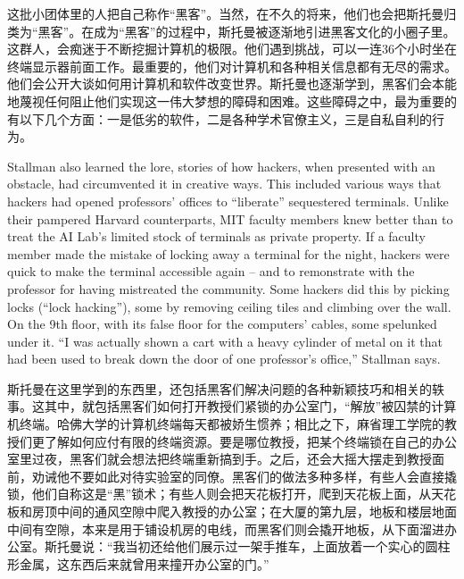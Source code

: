 \ifdefined\chs
这批小团体里的人把自己称作``黑客''。当然，在不久的将来，他们也会把斯托曼归类为``黑客''。在成为``黑客''的过程中，斯托曼被逐渐地引进黑客文化的小圈子里。这群人，会痴迷于不断挖掘计算机的极限。他们遇到挑战，可以一连36个小时坐在终端显示器前面工作。最重要的，他们对计算机和各种相关信息都有无尽的需求。他们会公开大谈如何用计算机和软件改变世界。斯托曼也逐渐学到，黑客们会本能地蔑视任何阻止他们实现这一伟大梦想的障碍和困难。这些障碍之中，最为重要的有以下几个方面：一是低劣的软件，二是各种学术官僚主义，三是自私自利的行为。
\fi

\ifdefined\eng
Stallman also learned the lore, stories of how hackers, when presented with an obstacle, had circumvented it in creative ways. This included various ways that hackers had opened professors' offices to ``liberate'' sequestered terminals. Unlike their pampered Harvard counterparts, MIT faculty members knew better than to treat the AI Lab's limited stock of terminals as private property. If a faculty member made the mistake of locking away a terminal for the night, hackers were quick to make the terminal accessible again -- and to remonstrate with the professor for having mistreated the community.  Some hackers did this by picking locks (``lock hacking''), some by removing ceiling tiles and climbing over the wall.  On the 9th floor, with its false floor for the computers' cables, some spelunked under it.  ``I was actually shown a cart with a heavy cylinder of metal on it that had been used to break down the door of one professor's office,'' Stallman says.
\fi

\ifdefined\chs
斯托曼在这里学到的东西里，还包括黑客们解决问题的各种新颖技巧和相关的轶事。这其中，就包括黑客们如何打开教授们紧锁的办公室门，``解放''被囚禁的计算机终端。哈佛大学的计算机终端每天都被娇生惯养；相比之下，麻省理工学院的教授们更了解如何应付有限的终端资源。要是哪位教授，把某个终端锁在自己的办公室里过夜，黑客们就会想法把终端重新搞到手。之后，还会大摇大摆走到教授面前，劝诫他不要如此对待实验室的同僚。黑客们的做法多种多样，有些人会直接撬锁，他们自称这是``黑''锁术；有些人则会把天花板打开，爬到天花板上面，从天花板和房顶中间的通风空隙中爬入教授的办公室；在大厦的第九层，地板和楼层地面中间有空隙，本来是用于铺设机房的电线，而黑客们则会撬开地板，从下面溜进办公室。斯托曼说：``我当初还给他们展示过一架手推车，上面放着一个实心的圆柱形金属，这东西后来就曾用来撞开办公室的门。''
\fi

